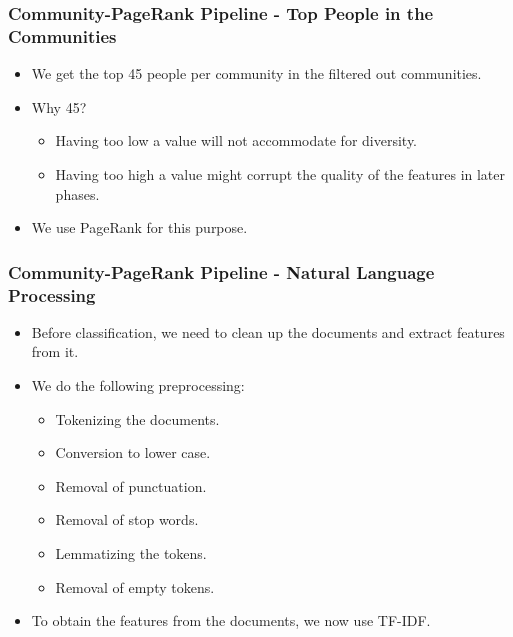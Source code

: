 \documentclass[9pt, compress]{beamer}
\begin{document}
\begin{frame}[fragile]
	\frametitle{Community-PageRank Pipeline - Top People in the Communities}
\vspace{-10mm}
\begin{itemize}
\item We get the top 45 people per community in the filtered out communities.
\item Why 45?
\begin{itemize}
\item Having too low a value will not accommodate for diversity.
\item Having too high a value might corrupt the quality of the features in later phases.
\end{itemize}
\item We use PageRank for this purpose.
\end{itemize}
\end{frame}

\begin{frame}[fragile]
	\frametitle{Community-PageRank Pipeline - Natural Language Processing}
\vspace{-10mm}
\begin{itemize}
\item Before classification, we need to clean up the documents and extract features from it.
\item We do the following preprocessing:
\begin{itemize}
\item Tokenizing the documents.
\item Conversion to lower case.
\item Removal of punctuation.
\item Removal of stop words.
\item Lemmatizing the tokens.
\item Removal of empty tokens.
\end{itemize}
\item To obtain the features from the documents, we now use TF-IDF.
\end{itemize}
\end{frame}
\end{document}
